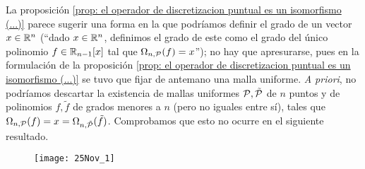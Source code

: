 La proposición
\ref{prop: el operador de discretizacion puntual es un isomorfismo (...)}
parece sugerir 
una forma en la que podríamos 
definir el grado de 
un vector $x \in \mathbb{R}^{n}$ (``dado $x \in \mathbb{R}^{n}$, definimos
el grado de este como el grado del único polinomio $f \in \mathbb{R}_{n-1}[x]$
tal que $\Omega_{n, \mathcal{P}}(f)=x$''); no hay
que apresurarse, pues en la formulación de
la proposición
\ref{prop: el operador de discretizacion puntual es un isomorfismo (...)}
se tuvo que fijar de antemano una malla uniforme.
\textit{A priori}, no podríamos descartar 
la existencia de mallas uniformes
$\mathcal{P}, \tilde{\mathcal{P}}$ 
de $n$ puntos
y de polinomios
$f, \tilde{f}$ de grados menores a $n$ (pero no 
iguales entre sí), tales que
$\Omega_{n, \mathcal{P}}(f) = x = \Omega_{n, \tilde{\mathcal{P}}}(\tilde{f})$.
Comprobamos que esto no ocurre
en el siguiente resultado.

\begin{figure}[H]
	\centering
	\texttt{[image: 25Nov\_1]} 
\end{figure}	


